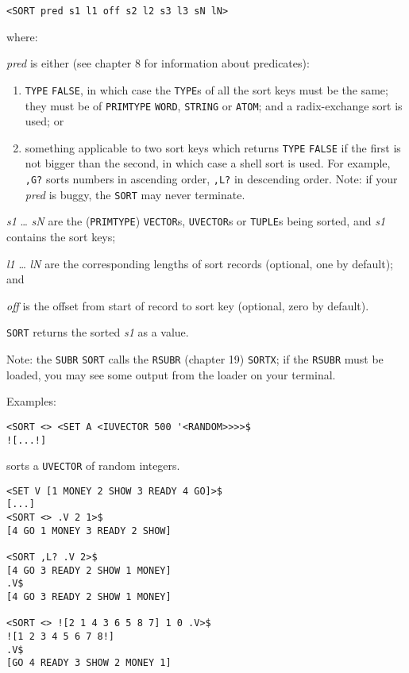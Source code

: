 \documentclass[a4paper,]{article}
\providecommand{\tightlist}{%
  \setlength{\itemsep}{0pt}\setlength{\parskip}{0pt}}
\begin{document}
\begin{verbatim}
<SORT pred s1 l1 off s2 l2 s3 l3 sN lN>
\end{verbatim}

where:

\emph{pred} is either (see chapter 8 for information about predicates):

\begin{enumerate}
\def\labelenumi{\arabic{enumi}.}
\tightlist
\item
  \texttt{TYPE} \texttt{FALSE}, in which case the \texttt{TYPE}s of all the sort keys must be the same; they must be of
  \texttt{PRIMTYPE} \texttt{WORD}, \texttt{STRING} or \texttt{ATOM}; and a radix-exchange sort is used; or
\item
  something applicable to two sort keys which returns \texttt{TYPE} \texttt{FALSE} if the first is not bigger than the
  second, in which case a shell sort is used. For example, \texttt{,G?} sorts numbers in ascending order, \texttt{,L?} in
  descending order. Note: if your \emph{pred} is buggy, the \texttt{SORT} may never terminate.
\end{enumerate}

\emph{s1} \ldots{} \emph{sN} are the (\texttt{PRIMTYPE}) \texttt{VECTOR}s, \texttt{UVECTOR}s or \texttt{TUPLE}s being
sorted, and \emph{s1} contains the sort keys;

\emph{l1} \ldots{} \emph{lN} are the corresponding lengths of sort records (optional, one by default); and

\emph{off} is the offset from start of record to sort key (optional, zero by default).

\texttt{SORT} returns the sorted \emph{s1} as a value.

Note: the \texttt{SUBR} \texttt{SORT} calls the \texttt{RSUBR} (chapter 19) \texttt{SORTX}; if the
\texttt{RSUBR} must be loaded, you may see some output from the loader on your terminal.

Examples:

\begin{verbatim}
<SORT <> <SET A <IUVECTOR 500 '<RANDOM>>>>$
![...!]
\end{verbatim}

sorts a \texttt{UVECTOR} of random integers.

\begin{verbatim}
<SET V [1 MONEY 2 SHOW 3 READY 4 GO]>$
[...]
<SORT <> .V 2 1>$
[4 GO 1 MONEY 3 READY 2 SHOW]

<SORT ,L? .V 2>$
[4 GO 3 READY 2 SHOW 1 MONEY]
.V$
[4 GO 3 READY 2 SHOW 1 MONEY]

<SORT <> ![2 1 4 3 6 5 8 7] 1 0 .V>$
![1 2 3 4 5 6 7 8!]
.V$
[GO 4 READY 3 SHOW 2 MONEY 1]
\end{verbatim}
\end{document}
